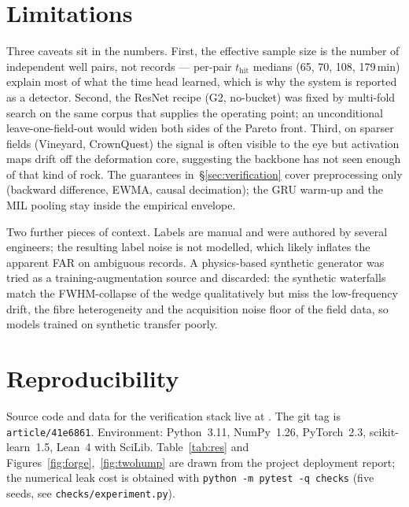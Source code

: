 \documentclass{article}
\begin{document}
\section{Limitations}
\label{sec:limitations}

Three caveats sit in the numbers. First, the effective sample size is
the number of independent well pairs, not records --- per-pair
$t_\text{hit}$ medians (65, 70, 108, 179\,min) explain most of what
the time head learned, which is why the system is reported as a
detector. Second, the ResNet recipe (G2, no-bucket) was fixed by
multi-fold search on the same corpus that supplies the operating
point; an unconditional leave-one-field-out would widen both sides of
the Pareto front. Third, on sparser fields (Vineyard, CrownQuest) the
signal is often visible to the eye but activation maps drift off the
deformation core, suggesting the backbone has not seen enough of that
kind of rock. The guarantees in~\S\ref{sec:verification} cover
preprocessing only (backward difference, EWMA, causal decimation); the
GRU warm-up and the MIL pooling stay inside the empirical envelope.

Two further pieces of context. Labels are manual and were authored by
several engineers; the resulting label noise is not modelled, which
likely inflates the apparent FAR on ambiguous records. A physics-based
synthetic generator was tried as a training-augmentation source and
discarded: the synthetic waterfalls match the FWHM-collapse of the
wedge qualitatively but miss the low-frequency drift, the fibre
heterogeneity and the acquisition noise floor of the field data, so
models trained on synthetic transfer poorly.

\section{Reproducibility}
\label{sec:reproducibility}

Source code and data for the verification stack live at
.
The git tag is \texttt{article/41e6861}. Environment:
Python~3.11, NumPy~1.26, PyTorch~2.3, scikit-learn~1.5,
Lean~4 with SciLib. Table~\ref{tab:res} and
Figures~\ref{fig:forge},~\ref{fig:twohump} are drawn from the project
deployment report; the numerical leak cost is obtained with
\texttt{python -m pytest -q checks} (five seeds,
see \texttt{checks/experiment.py}).
\end{document}
